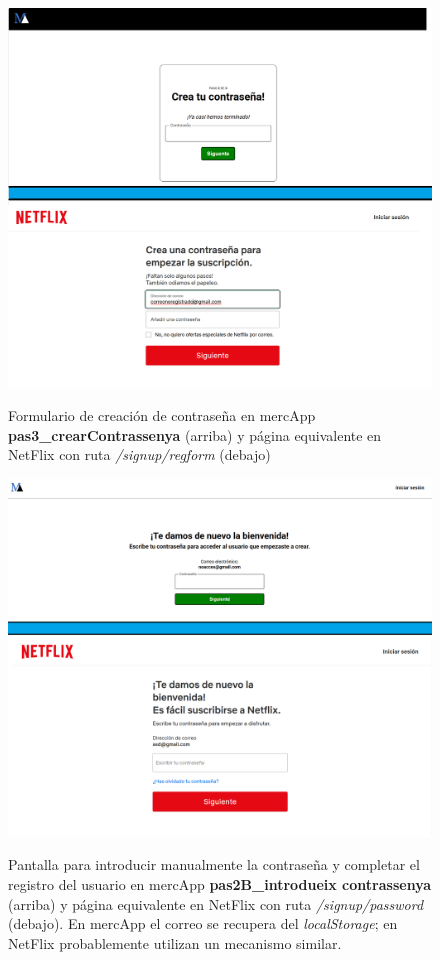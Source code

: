 \documentclass[a4paper,12pt]{report}
\begin{document}
	\FloatBarrier
	\setlength{\belowcaptionskip}{3pt}
	\begin{figure}[H]
		\centering
		\caption{Formulario de creación de contraseña en mercApp \textbf{pas3\_crearContrassenya} (arriba) y página equivalente en NetFlix con ruta \textit{/signup/regform} (debajo)}
		\includegraphics[width=1\linewidth]{img/crearContrassenya}
		\label{fig:crearContrassenya}
	\end{figure}
	\FloatBarrier
	

	\FloatBarrier
	\setlength{\belowcaptionskip}{3pt}
	\begin{figure}[H]
		\centering
		\caption{Pantalla para introducir manualmente la contraseña y completar el registro del usuario en mercApp \textbf{pas2B\_introdueix contrassenya} (arriba) y página equivalente en NetFlix con ruta \textit{/signup/password} (debajo). En mercApp el correo se recupera del \textit{localStorage}; en NetFlix probablemente utilizan un mecanismo similar.}
		\includegraphics[width=1\linewidth]{img/introdueixContrassenya}
		\label{fig:introdueixContrassenya}
	\end{figure}
	\FloatBarrier
	
\end{document}
